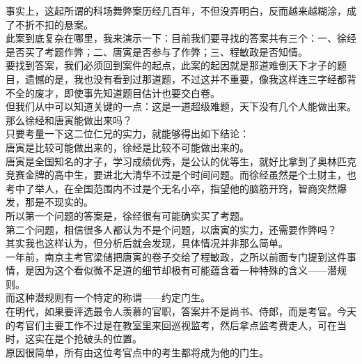 \begin{multicols}{\theparacolNo}
事实上，这起所谓的科场舞弊案历经几百年，不但没弄明白，反而越来越糊涂，成了不折不扣的悬案。\\

此案到底复杂在哪里，我来演示一下：目前我们要寻找的答案共有三个：一、徐经是否买了考题作弊；二、唐寅是否参与了作弊；三、程敏政是否知情。\\

要找到答案，我们必须回到案件的起点，此案的起因就是那道难倒天下才子的题目，遗憾的是，我也没有看到过那道题，不过这并不重要，像我这样连三字经都背不全的废才，即使事先知道题目估计也要交白卷。\\

但我们从中可以知道关键的一点：这是一道超级难题，天下没有几个人能做出来。\\

那么徐经和唐寅能做出来吗？\\

只要考量一下这二位仁兄的实力，就能够得出如下结论：\\

唐寅是比较可能做出来的，徐经是比较不可能做出来的。\\

唐寅是全国知名的才子，学习成绩优秀，是公认的优等生，就好比拿到了奥林匹克竞赛金牌的高中生，要进北大清华不过是个时间问题。而徐经虽然是个土财主，也考中了举人，在全国范围内不过是个无名小卒，指望他的脑筋开窍，智商突然爆发，那是不现实的。\\

所以第一个问题的答案是，徐经很有可能确实买了考题。\\

第二个问题，相信很多人都认为不是个问题，以唐寅的实力，还需要作弊吗？\\

其实我也这样认为，但分析后就会发现，具体情况并非那么简单。\\

一年前，南京主考官梁储把唐寅的卷子交给了程敏政，之所以前面专门提到这件事情，是因为这个看似微不足道的细节却极有可能蕴含着一种特殊的含义——潜规则。\\

而这种潜规则有一个特定的称谓——约定门生。\\

在明代，如果要评选最令人羡慕的官职，答案并不是尚书、侍郎，而是考官。今天的考官们主要工作不过是在教室里来回巡视监考，然后拿点监考费走人，可在当时，这实在是个抢破头的位置。\\

原因很简单，所有由这位考官点中的考生都将成为他的门生。\\


\end{multicols}
